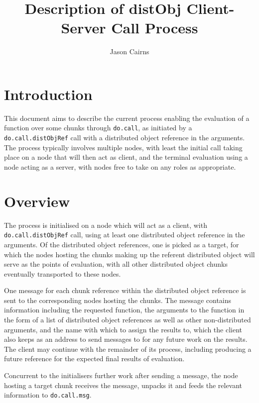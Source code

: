 \documentclass[a4paper,10pt]{article}
\begin{document}
\title{Description of distObj Client-Server Call Process}
\author{Jason Cairns}
  
\maketitle{}

\section{Introduction}
This document aims to describe the current process enabling the evaluation of a
function over some chunks through \texttt{do.call}, as initiated by a
\texttt{do.call.distObjRef} call with a distributed object reference
in the arguments.
The process typically involves multiple nodes, with least the initial call
taking place on a node that will then act as client, and the terminal
evaluation using a node acting as a server, with nodes free to take on any
roles as appropriate.

\section{Overview}

The process is initialised on a node which will act as a client, with
\texttt{do.call.distObjRef} call, using at least one distributed
object reference in the arguments.
Of the distributed object references, one is picked as a target, for which the
nodes hosting the chunks making up the referent distributed object will serve
as the points of evaluation, with all other distributed object chunks
eventually transported to these nodes.

One message for each chunk reference within the distributed object reference is sent to the corresponding nodes hosting the chunks.
The message contains information including the requested function, the
arguments to the function in the form of a list of distributed object
references as well as other non-distributed arguments, and the name with which
to assign the results to, which the client also keeps as an address to send
messages to for any future work on the results.
The client may continue with the remainder of its process, including producing a future reference for the expected final results of evaluation.

Concurrent to the initialisers further work after sending a message, the node hosting a target chunk receives the message, unpacks it and feeds the relevant information to \texttt{do.call.msg}.
\end{document}
